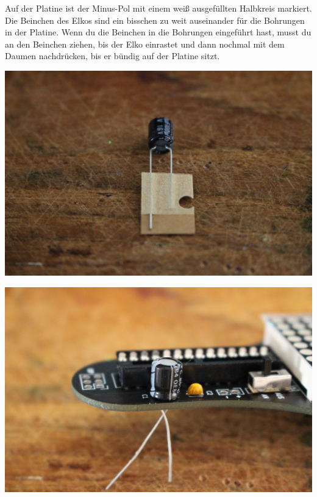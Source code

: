 \documentclass{article}
\begin{document}
Auf der Platine ist der Minus-Pol mit einem weiß ausgefüllten Halbkreis markiert.\\

Die Beinchen des Elkos sind ein bisschen zu weit auseinander für die Bohrungen in der Platine. Wenn du die Beinchen in die Bohrungen eingeführt hast, musst du an den Beinchen ziehen, bis der Elko einrastet und dann nochmal mit dem Daumen nachdrücken, bis er bündig auf der Platine sitzt.

\vspace{1cm}

\begin{minipage}[b]{0.5\textwidth}
	\includegraphics[width=\textwidth]{Bilder2022/IMG_8235.JPG}
\end{minipage}
\begin{minipage}[b]{0.5\textwidth}
	\includegraphics[width=\textwidth]{Bilder2022/IMG_8236.JPG}
\end{minipage}
\end{document}
